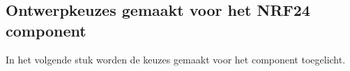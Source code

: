 \documentclass[a4paper, 11pt, oneside]{report}
\begin{document}
\subsection{Ontwerpkeuzes gemaakt voor het NRF24 component}
\label{DetailedDesign:NRF24:ontwerkeuzes}
In het volgende stuk worden de keuzes gemaakt voor het component toegelicht.





\clearpage
\appendix
\end{document}
